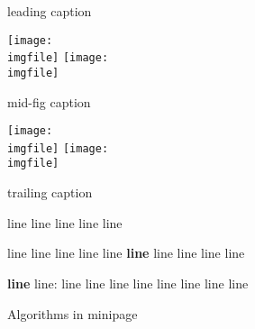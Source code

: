 \documentclass{article}
\def\imgfile{../graphics/none.png}
\begin{document}
\begin{figure}
  \caption{leading caption}
  \texttt{[image: \\imgfile]}\hspace{2cm}%
  \texttt{[image: \\imgfile]}\newline
  \caption{mid-fig caption}
  \texttt{[image: \\imgfile]}\hspace{2cm}%
  \texttt{[image: \\imgfile]}%
  \caption{trailing caption}
\end{figure}
\clearpage

\begin{figure*}[tb]
  \begin{minipage}{0.56\textwidth}

  \vspace{-10px}
  \begin{algorithm}[H]
    \caption{Algorithms in minipage}
    \label{alg:main}
  \begin{algorithmic}[1]
    \REQUIRE line
    \STATE line
    \STATE line
    \STATE line
    \STATE line


      \STATE line
      \STATE line
    \ENDFOR
    \STATE
    \STATE line
      \STATE line
        \STATE line
        \STATE \textbf{line}
        \STATE \hspace{16px} line
        \STATE \hspace{16px} line
        \STATE \hspace{16px} line
        \STATE \hspace{16px} line

        \STATE \textbf{line} line:
        \STATE \hspace{16px} line
        \STATE \hspace{16px} line
        \STATE \hspace{16px} line
        \STATE \hspace{16px} line
        \STATE \hspace{16px} \hspace{16px} line
        \STATE \hspace{16px} \hspace{16px} line
        \STATE \hspace{16px} line
        \STATE \hspace{16px} line


\end{algorithmic}
\end{algorithm}
\end{minipage}
\end{figure*}
\end{document}
